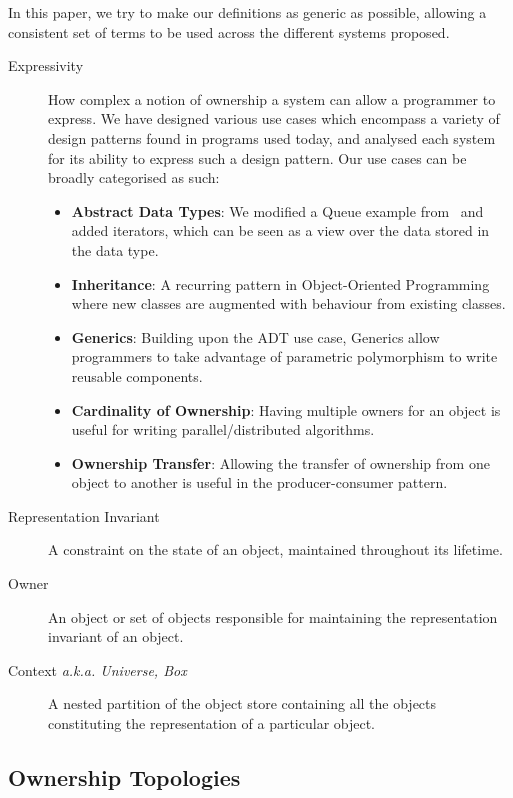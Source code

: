 \documentclass{acm_proc_article-sp}
\begin{document}
In this paper, we try to make our definitions as generic as possible, allowing
a consistent set of terms to be used across the different systems proposed.

\begin{description}
	\item[Expressivity] How complex a notion of ownership a system can allow a
		programmer to express. We have designed various use cases which
		encompass a variety of design patterns found in programs used today, and
		analysed each system for its ability to express such a design pattern.
		Our use cases can be broadly categorised as such:

	\begin{itemize}
		\item \textbf{Abstract Data Types}: We modified a Queue example
			from~\cite{boyapati04safejava} and added iterators, which can be
			seen as a view over the data stored in the data type.
		\item \textbf{Inheritance}: A recurring pattern in Object-Oriented
			Programming where new classes are augmented with behaviour from
			existing classes.
		\item \textbf{Generics}: Building upon the ADT use case, Generics
			allow programmers to take advantage of parametric polymorphism to
			write reusable components.
		\item \textbf{Cardinality of Ownership}: Having multiple owners for an
			object is useful for writing parallel/distributed algorithms.
		\item \textbf{Ownership Transfer}: Allowing the transfer of ownership
			from one object to another is useful in the \linebreak
			producer-consumer pattern.
	\end{itemize}

	\item[Representation Invariant] A constraint on the state of an object,
		maintained throughout its lifetime.
	\item[Owner] An object or set of objects responsible for maintaining the
		representation invariant of an object.
	\item[Context \emph{a.k.a. Universe, Box}] A nested partition of the object
		store containing all the objects constituting the representation of
		a particular object.
\end{description}

\subsection{Ownership Topologies}
\label{subsec:topologies}
\end{document}
